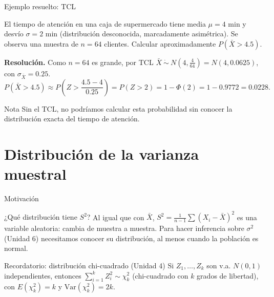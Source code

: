 \documentclass[aspectratio=169,11pt]{beamer}
\begin{document}
\begin{frame}{Ejemplo resuelto: TCL}
\begin{example}
El tiempo de atención en una caja de supermercado tiene media $\mu=4$ min y desvío $\sigma=2$ min (distribución desconocida, marcadamente asimétrica). Se observa una muestra de $n=64$ clientes. Calcular aproximadamente $P(\bar X > 4.5)$.

\textbf{Resolución.} Como $n=64$ es grande, por TCL $\bar X \ \dot\sim\ N\left(4, \frac{4}{64}\right) = N(4, 0.0625)$, con $\sigma_{\bar X}=0.25$.
$$P(\bar X>4.5) \approx P\left(Z > \frac{4.5-4}{0.25}\right) = P(Z>2) = 1-\Phi(2) = 1-0.9772 = 0.0228.$$
\end{example}

\begin{block}{Nota}
Sin el TCL, no podríamos calcular esta probabilidad sin conocer la distribución exacta del tiempo de atención.
\end{block}
\end{frame}

\section{Distribución de la varianza muestral}

\begin{frame}{Motivación}
\begin{block}{¿Qué distribución tiene $S^2$?}
Al igual que con $\bar X$, $S^2 = \frac{1}{n-1}\sum (X_i-\bar X)^2$ es una variable aleatoria: cambia de muestra a muestra. Para hacer inferencia sobre $\sigma^2$ (Unidad 6) necesitamos conocer su distribución, al menos cuando la población es normal.
\end{block}

\begin{alertblock}{Recordatorio: distribución chi-cuadrado (Unidad 4)}
Si $Z_1,\dots,Z_k$ son v.a. $N(0,1)$ independientes, entonces $\sum_{i=1}^k Z_i^2 \sim \chi^2_k$ (chi-cuadrado con $k$ grados de libertad), con $E(\chi^2_k)=k$ y $\text{Var}(\chi^2_k)=2k$.
\end{alertblock}
\end{frame}
\end{document}
